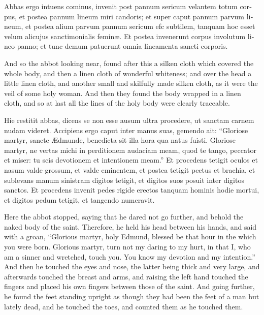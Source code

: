 \documentclass{book}
\begin{document}
\begin{paracol}{2}
\switchcolumn*

\begin{otherlanguage}{latin}
Abbas ergo intuens cominus, invenit post pannum sericum velantem totum corpus, et postea pannum lineum miri candoris; et super caput pannum parvum lineum, et postea alium parvum pannum sericum efc subtilem, tanquam hoc esset velum alicujus sanctimonialis femin\ae{}. Et postea invenerunt corpus involutum lineo panno; et tunc demum patuerunt omnia lineamenta sancti corporis.
\end{otherlanguage}

\switchcolumn

And so the abbot looking near, found after this a silken cloth which covered the whole body, and then a linen cloth of wonderful whiteness; and over the head a little linen cloth, and another small and skilfully made silken cloth, as it were the veil of some holy woman. And then they found the body wrapped in a linen cloth, and so at last all the lines of the holy body were clearly traceable.

\switchcolumn*

\begin{otherlanguage}{latin}
Hie restitit abbas, dicens se non esse ausum ultra procedere, ut sanctam carnem nudam videret. Accipiens ergo caput inter manus suas, gemendo ait: ``Gloriose martyr, sancte \AE{}dmunde, benedicta sit illa hora qua natus fuisti. Gloriose martyr, ne vertas michi in perditionem audaciam meam, quod te tango, peccator et miser: tu scis devotionem et intentionem meam.'' Et procedens tetigit oculos et nasum valde grossum, et valde eminentem, et postea tetigit pectus et brachia, et sublevans manum sinistram digitos tetigit, et digitos suos posuit inter digitos sanctos. Et procedens invenit pedes rigide erectos tanquam hominis hodie mortui, et digitos pedum tetigit, et tangendo numeravit. 
\end{otherlanguage}

\switchcolumn

Here the abbot stopped, saying that he dared not go further, and behold the naked body of the saint. Therefore, he held his head between his hands, and said with a groan, ``Glorious martyr, holy Edmund, blessed be that hour in the which you were born. Glorious martyr, turn not my daring to my hurt, in that I, who am a sinner and wretched, touch you. You know my devotion and my intention.'' And then he touched the eyes and nose, the latter being thick and very large, and afterwards touched the breast and arms, and raising the left hand touched the fingers and placed his own fingers between those of the saint. And going further, he found the feet standing upright as though they had been the feet of a man but lately dead, and he touched the toes, and counted them as he touched them.


\end{paracol}
\end{document}
